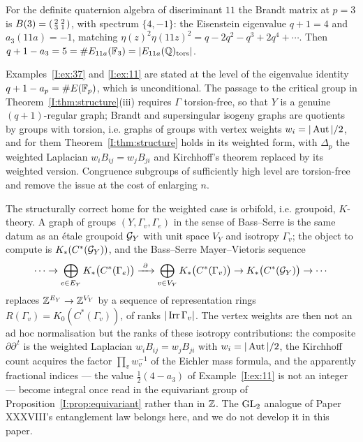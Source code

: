 \begin{example}[Level $11$, $p=3$]\label{I:ex:11}
For the definite quaternion algebra of discriminant $11$ the Brandt matrix at $p=3$ is
$B(3)=\begin{psmallmatrix}2&2\\3&1\end{psmallmatrix}$, with spectrum $\{4,-1\}$: the
Eisenstein eigenvalue $q+1=4$ and $a_3(11a)=-1$, matching
$\eta(z)^2\eta(11z)^2=q-2q^2-q^3+2q^4+\cdots$. Then
$q+1-a_3=5=\#E_{11a}(\mathbb{F}_3)=|E_{11a}(\mathbb{Q})_{\mathrm{tors}}|$.
\end{example}

\begin{remark}\label{I:rem:weights}
Examples~\ref{I:ex:37} and \ref{I:ex:11} are stated at the level of the eigenvalue identity
$q+1-a_p=\#E(\mathbb{F}_p)$, which is unconditional. The passage to the critical group in
Theorem~\ref{I:thm:structure}(iii) requires $\Gamma$ torsion-free, so that $Y$ is a genuine
$(q+1)$-regular graph; Brandt and supersingular isogeny graphs are quotients by groups
with torsion, i.e. graphs of groups with vertex weights $w_i=|\operatorname{Aut}|/2$, and for them
Theorem~\ref{I:thm:structure} holds in its weighted form, with $\Delta_p$ the weighted
Laplacian $w_iB_{ij}=w_jB_{ji}$ and Kirchhoff's theorem replaced by its weighted
version. Congruence subgroups of sufficiently high level are torsion-free and remove the
issue at the cost of enlarging $n$.

The structurally correct home for the weighted case is orbifold, i.e. groupoid,
$K$-theory. A graph of groups $(Y,\Gamma_v,\Gamma_e)$ in the sense of Bass--Serre is the
same datum as an \'etale groupoid $\mathcal{G}_{Y}$ with unit space $V_Y$ and isotropy
$\Gamma_v$; the object to compute is $K_*(C^*(\mathcal{G}_Y))$, and the Bass--Serre
Mayer--Vietoris sequence
\[
\cdots\to\bigoplus_{e\in E_Y}K_*\bigl(C^*(\Gamma_e)\bigr)
\xrightarrow{\ \partial\ }\bigoplus_{v\in V_Y}K_*\bigl(C^*(\Gamma_v)\bigr)
\to K_*\bigl(C^*(\mathcal{G}_Y)\bigr)\to\cdots
\]
replaces $\mathbb{Z}^{E_Y}\to\mathbb{Z}^{V_Y}$ by a sequence of representation rings
$R(\Gamma_v)=K_0(C^*(\Gamma_v))$, of ranks $|\operatorname{Irr}\Gamma_v|$. The vertex weights are then
not an ad hoc normalisation but the ranks of these isotropy contributions: the composite
$\partial\partial^{\,t}$ is the weighted Laplacian $w_iB_{ij}=w_jB_{ji}$ with
$w_i=|\operatorname{Aut}|/2$, the Kirchhoff count acquires the factor $\prod_vw_v^{-1}$ of the
Eichler mass formula, and the apparently fractional indices --- the value
$\tfrac12(4-a_3)$ of Example~\ref{I:ex:11} is not an integer --- become integral once read
in the equivariant group of Proposition~\ref{I:prop:equivariant} rather than in $\mathbb{Z}$. The
$\mathrm{GL}_2$ analogue of Paper XXXVIII's entanglement law belongs here, and we do not develop
it in this paper.
\end{remark}

